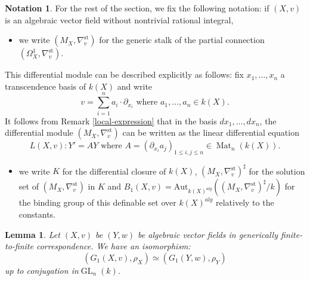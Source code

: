 \documentclass[12pt]{amsart}
\DeclareMathOperator{\Mat}{Mat}
\DeclareMathOperator{\GL}{GL}
\theoremstyle{definition}
\newtheorem{example}[definition]{Example}
\newtheorem{notation}[definition]{Notation}
\theoremstyle{plain}
\newtheorem{lemma}[definition]{Lemma}
\theoremstyle{exampstyle}
\theoremstyle{exampstyle}\newtheorem{thmxbis}{Theorem}
\numberwithin{equation}{section}
\theoremstyle{remark}
\begin{document}
\begin{notation} \label{example-standard}
For the rest of the section,  we fix the following notation: if $(X,v)$ is an algebraic vector field without nontrivial rational integral, 
\begin{itemize} 
\item we write $(M_X,\nabla_v^{\mathrm{st}})$ for the generic stalk of the partial connection $(\Omega^1_X, \nabla^{\mathrm{st}}_v)$. 
\end{itemize}
This differential module can be described explicitly as follows: fix $x_1,\ldots, x_n$ a transcendence basis of $k(X)$ and write
$$ v = \sum_{i= 1}^n a_i  \cdot \partial_{x_i} \text{ where } a_1,\ldots, a_n \in k(X).$$ 
It follows from Remark \ref{local-expression} that in the basis  $dx_1,\ldots,dx_n$, the differential module $(M_X,\nabla_v^{\mathrm{st}})$ can be written as the linear differential equation 
$$L(X,v): Y' = A Y \text{ where } A = (\partial_{x_i}{a_j})_{1 \leq i,j\leq n} \in \Mat_n(k(X)).$$ 

\begin{itemize} 
\item we write $K$ for the differential closure of $k(X)$, $(M_X,\nabla_v^{\mathrm{st}})^\sharp$ for the solution set of $(M_X,\nabla_v^{\mathrm{st}})$ in $K$ and $B_1(X,v) = \mathrm{Aut}_{k(X)^{alg}}((M_X,\nabla_v^{\mathrm{st}})^\sharp/k)$ for the binding group of this definable set over $k(X)^{alg}$ relatively to the constants. 
\end{itemize}
\end{notation} 

\begin{lemma} \label{lemma-Galois group}
Let $(X,v)$ be $(Y,w)$ be algebraic vector fields in generically finite-to-finite correspondence.  We have an isomorphism: 
$$(G_1(X,v),\rho_X) \simeq (G_1(Y,w),\rho_Y)$$
up to conjugation in$\GL_n(k)$.
\end{lemma}
\end{document}
